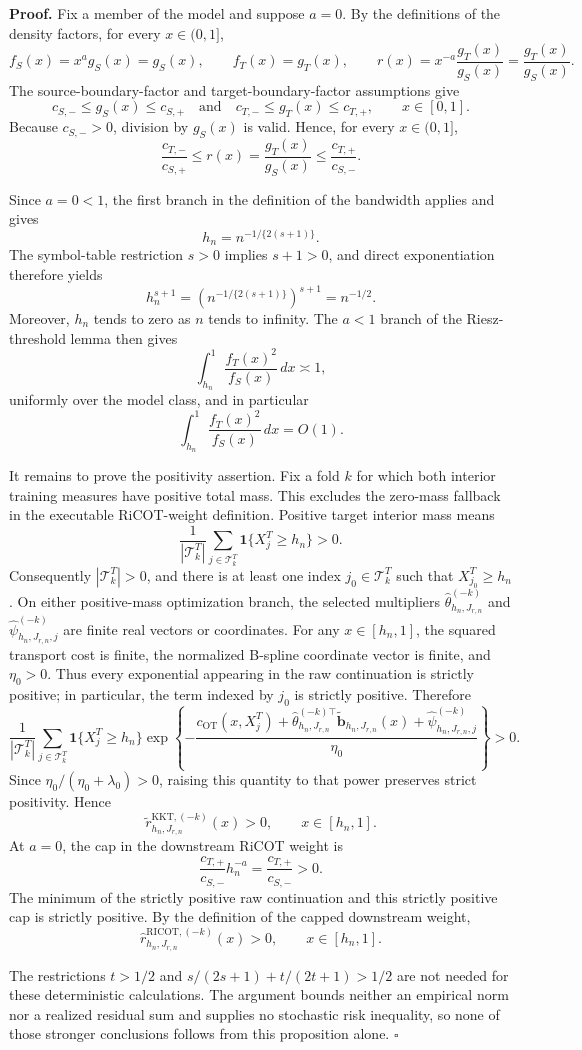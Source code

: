 \textbf{Proof.}
Fix a member of the model and suppose \(a=0\).  By the definitions of the density factors, for every \(x\in(0,1]\),
\[
f_S(x)=x^a g_S(x)=g_S(x),
\qquad
f_T(x)=g_T(x),
\qquad
r(x)=x^{-a}\frac{g_T(x)}{g_S(x)}=\frac{g_T(x)}{g_S(x)}.
\]
The source-boundary-factor and target-boundary-factor assumptions give
\[
c_{S,-}\le g_S(x)\le c_{S,+}
\quad\text{and}\quad
c_{T,-}\le g_T(x)\le c_{T,+},
\qquad x\in[0,1].
\]
Because \(c_{S,-}>0\), division by \(g_S(x)\) is valid.  Hence, for every \(x\in(0,1]\),
\[
\frac{c_{T,-}}{c_{S,+}}
\le r(x)=\frac{g_T(x)}{g_S(x)}
\le\frac{c_{T,+}}{c_{S,-}}.
\]

Since \(a=0<1\), the first branch in the definition of the bandwidth applies and gives
\[
h_n=n^{-1/\{2(s+1)\}}.
\]
The symbol-table restriction \(s>0\) implies \(s+1>0\), and direct exponentiation therefore yields
\[
h_n^{s+1}
=\left(n^{-1/\{2(s+1)\}}\right)^{s+1}
=n^{-1/2}.
\]
Moreover, \(h_n\) tends to zero as \(n\) tends to infinity.  The \(a<1\) branch of the Riesz-threshold lemma then gives
\[
\int_{h_n}^1\frac{f_T(x)^2}{f_S(x)}\,dx\asymp 1,
\]
uniformly over the model class, and in particular
\[
\int_{h_n}^1\frac{f_T(x)^2}{f_S(x)}\,dx=O(1).
\]

It remains to prove the positivity assertion.  Fix a fold \(k\) for which both interior training measures have positive total mass.  This excludes the zero-mass fallback in the executable RiCOT-weight definition.  Positive target interior mass means
\[
\frac{1}{|\mathcal T^T_k|}
\sum_{j\in\mathcal T^T_k}\mathbf 1\{X_j^T\ge h_n\}>0.
\]
Consequently \(|\mathcal T^T_k|>0\), and there is at least one index \(j_0\in\mathcal T^T_k\) such that \(X_{j_0}^T\ge h_n\).  On either positive-mass optimization branch, the selected multipliers \(\widehat\theta^{(-k)}_{h_n,J_{r,n}}\) and \(\widehat\psi^{(-k)}_{h_n,J_{r,n},j}\) are finite real vectors or coordinates.  For any \(x\in[h_n,1]\), the squared transport cost is finite, the normalized B-spline coordinate vector is finite, and \(\eta_0>0\).  Thus every exponential appearing in the raw continuation is strictly positive; in particular, the term indexed by \(j_0\) is strictly positive.  Therefore
\[
\frac1{|\mathcal T^T_k|}
\sum_{j\in\mathcal T^T_k}\mathbf 1\{X_j^T\ge h_n\}
\exp\!\left\{-\frac{
c_{\mathrm{OT}}(x,X_j^T)
+\widehat\theta_{h_n,J_{r,n}}^{(-k)\top}
\widetilde{\mathbf b}_{h_n,J_{r,n}}(x)
+\widehat\psi^{(-k)}_{h_n,J_{r,n},j}}
{\eta_0}\right\}>0.
\]
Since \(\eta_0/(\eta_0+\lambda_0)>0\), raising this quantity to that power preserves strict positivity.  Hence
\[
\widetilde r^{\mathrm{KKT},(-k)}_{h_n,J_{r,n}}(x)>0,
\qquad x\in[h_n,1].
\]
At \(a=0\), the cap in the downstream RiCOT weight is
\[
\frac{c_{T,+}}{c_{S,-}}h_n^{-a}
=\frac{c_{T,+}}{c_{S,-}}>0.
\]
The minimum of the strictly positive raw continuation and this strictly positive cap is strictly positive.  By the definition of the capped downstream weight,
\[
\widehat r^{\mathrm{RICOT},(-k)}_{h_n,J_{r,n}}(x)>0,
\qquad x\in[h_n,1].
\]

The restrictions \(t>1/2\) and \(s/(2s+1)+t/(2t+1)>1/2\) are not needed for these deterministic calculations.  The argument bounds neither an empirical norm nor a realized residual sum and supplies no stochastic risk inequality, so none of those stronger conclusions follows from this proposition alone. \(\square\)